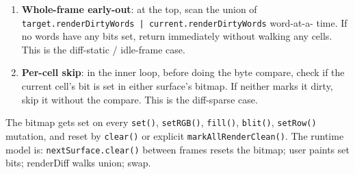 \begin{enumerate}
\def\labelenumi{\arabic{enumi}.}
\tightlist
\item
  \textbf{Whole-frame early-out}: at the top, scan the union of \texttt{t\allowbreak{}a\allowbreak{}r\allowbreak{}g\allowbreak{}e\allowbreak{}t\allowbreak{}.\allowbreak{}r\allowbreak{}e\allowbreak{}n\allowbreak{}d\allowbreak{}e\allowbreak{}r\allowbreak{}D\allowbreak{}i\allowbreak{}r\allowbreak{}t\allowbreak{}y\allowbreak{}W\allowbreak{}o\allowbreak{}r\allowbreak{}d\allowbreak{}s\allowbreak{} \allowbreak{}|\allowbreak{} \allowbreak{}c\allowbreak{}u\allowbreak{}r\allowbreak{}r\allowbreak{}e\allowbreak{}n\allowbreak{}t\allowbreak{}.\allowbreak{}r\allowbreak{}e\allowbreak{}n\allowbreak{}d\allowbreak{}e\allowbreak{}r\allowbreak{}D\allowbreak{}i\allowbreak{}r\allowbreak{}t\allowbreak{}y\allowbreak{}W\allowbreak{}o\allowbreak{}r\allowbreak{}d\allowbreak{}s} word-at-a- time. If no words have any bits set, return immediately without walking any cells. This is the diff-static / idle-frame case.
\item
  \textbf{Per-cell skip}: in the inner loop, before doing the byte compare, check if the current cell's bit is set in either surface's bitmap. If neither marks it dirty, skip it without the compare. This is the diff-sparse case.
\end{enumerate}

The bitmap gets set on every \texttt{s\allowbreak{}e\allowbreak{}t\allowbreak{}(\allowbreak{})}, \texttt{s\allowbreak{}e\allowbreak{}t\allowbreak{}R\allowbreak{}G\allowbreak{}B\allowbreak{}(\allowbreak{})}, \texttt{f\allowbreak{}i\allowbreak{}l\allowbreak{}l\allowbreak{}(\allowbreak{})}, \texttt{b\allowbreak{}l\allowbreak{}i\allowbreak{}t\allowbreak{}(\allowbreak{})}, \texttt{s\allowbreak{}e\allowbreak{}t\allowbreak{}R\allowbreak{}o\allowbreak{}w\allowbreak{}(\allowbreak{})} mutation, and reset by \texttt{c\allowbreak{}l\allowbreak{}e\allowbreak{}a\allowbreak{}r\allowbreak{}(\allowbreak{})} or explicit \texttt{m\allowbreak{}a\allowbreak{}r\allowbreak{}k\allowbreak{}A\allowbreak{}l\allowbreak{}l\allowbreak{}R\allowbreak{}e\allowbreak{}n\allowbreak{}d\allowbreak{}e\allowbreak{}r\allowbreak{}C\allowbreak{}l\allowbreak{}e\allowbreak{}a\allowbreak{}n\allowbreak{}(\allowbreak{})}. The runtime model is: \texttt{n\allowbreak{}e\allowbreak{}x\allowbreak{}t\allowbreak{}S\allowbreak{}u\allowbreak{}r\allowbreak{}f\allowbreak{}a\allowbreak{}c\allowbreak{}e\allowbreak{}.\allowbreak{}c\allowbreak{}l\allowbreak{}e\allowbreak{}a\allowbreak{}r\allowbreak{}(\allowbreak{})} between frames resets the bitmap; user paints set bits; renderDiff walks union; swap.

